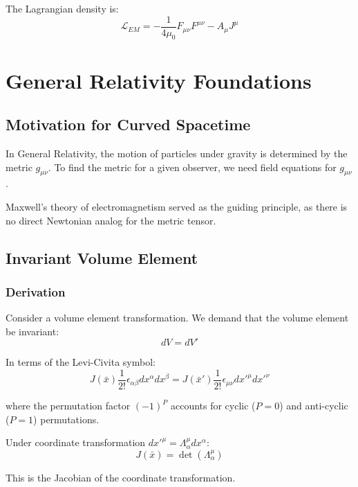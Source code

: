 \documentclass[11pt,a4paper]{article}
\begin{document}
The Lagrangian density is:
\begin{equation}
\mathcal{L}_{EM} = -\frac{1}{4\mu_0} F_{\mu\nu}F^{\mu\nu} - A_\mu J^\mu
\end{equation}

\section{General Relativity Foundations}

\subsection{Motivation for Curved Spacetime}

In General Relativity, the motion of particles under gravity is determined by the metric $g_{\mu\nu}$. To find the metric for a given observer, we need field equations for $g_{\mu\nu}$.

Maxwell's theory of electromagnetism served as the guiding principle, as there is no direct Newtonian analog for the metric tensor.

\subsection{Invariant Volume Element}

\subsubsection{Derivation}

Consider a volume element transformation. We demand that the volume element be invariant:
\begin{equation}
dV = dV'
\end{equation}

In terms of the Levi-Civita symbol:
\begin{equation}
J(\bar{x}) \frac{1}{2!} \epsilon_{\alpha\beta} dx^\alpha dx^\beta = J(\bar{x}') \frac{1}{2!} \epsilon_{\mu\nu} dx'^\mu dx'^\nu
\end{equation}

where the permutation factor $(-1)^P$ accounts for cyclic ($P=0$) and anti-cyclic ($P=1$) permutations.

Under coordinate transformation $dx'^\mu = \Lambda^\mu_\alpha dx^\alpha$:
\begin{equation}
J(\bar{x}) = \det(\Lambda^\mu_\alpha)
\end{equation}

This is the Jacobian of the coordinate transformation.
\end{document}
